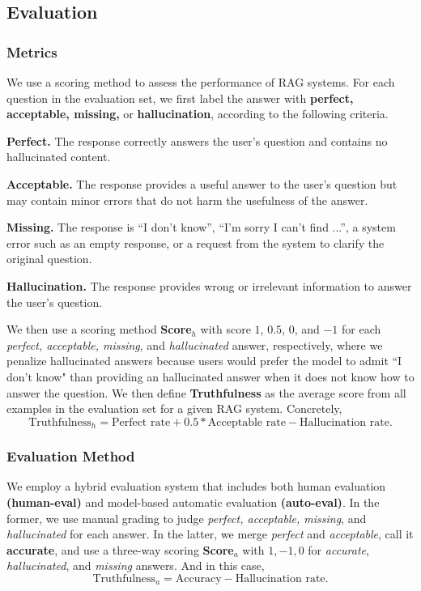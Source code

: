 \subsection{Evaluation}
\label{sec:evaluation}

\subsubsection{Metrics}
\label{sec:metrics}
We use a scoring method to assess the performance of RAG systems. For each question in the evaluation set, we first label the answer with \textbf{perfect, acceptable, missing,} or \textbf{hallucination}, according to the following criteria.

\textbf{Perfect.} The response correctly answers the user's question and contains no hallucinated content.

\textbf{Acceptable.} The response provides a useful answer to the user's question but may contain minor errors that do not harm the usefulness of the answer.

\textbf{Missing.} The response is ``I don't know'', ``I'm sorry I can't find ...'', a system error such as an empty response, or a request from the system to clarify the original question.

\textbf{Hallucination.} The response provides wrong or irrelevant information to answer the user's question.
 
We then use a scoring method {\bf Score$_h$} with score $1$, $0.5$, $0$, and $-1$ for each \textit{perfect, acceptable, missing}, and \textit{hallucinated} answer, respectively, where we penalize hallucinated answers because users would prefer the model to admit ``I don't know" than providing an hallucinated answer when it does not know how to answer the question. We then define \textbf{Truthfulness} as the average score from all examples in the evaluation set for a given RAG system. Concretely, 
$$ \text{Truthfulness}_h = \text{Perfect rate} + 0.5 * \text{Acceptable rate} - \text{Hallucination rate}. $$


\subsubsection{Evaluation Method}
\label{sec:evaluation}
We employ a hybrid evaluation system that includes both human evaluation {\bf (human-eval)} and model-based automatic evaluation {\bf (auto-eval)}. In the former, we use manual grading to judge {\em perfect, acceptable, missing}, and {\em hallucinated} for each answer. In the latter, we merge {\em perfect} and {\em acceptable}, call it {\bf accurate}, and use a three-way scoring {\bf Score$_a$} with $1,-1,0$ for {\em accurate}, {\em hallucinated}, and {\em missing} answers. And in this case, 
$$ \text{Truthfulness}_a = \text{Accuracy} - \text{Hallucination rate}. $$

